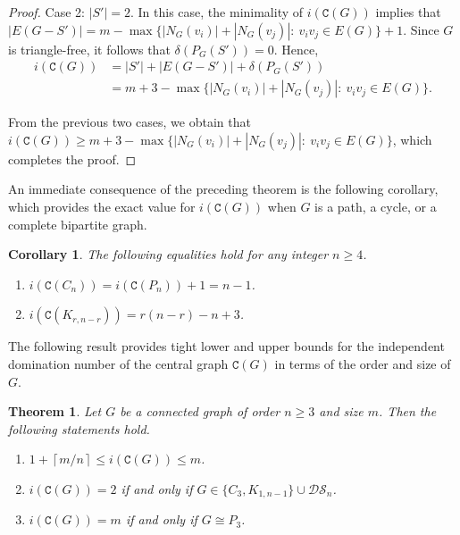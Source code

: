 \documentclass[12pt]{article}
\newtheorem{theorem}[remark]{Theorem}
\newtheorem{corollary}[remark]{Corollary}
\begin{document}
\begin{proof}
\vspace{.2cm}	

\noindent
Case 2: $|S'| =2$. In this case, the minimality of $i(\mathtt{C}(G))$ implies that $|E(G-S')| = m - \max \{|N_G(v_i)| + |N_G(v_j)|:\ v_iv_j \in E(G)\} + 1$. Since $G$ is triangle-free, it follows that  $\delta(P_{G}(S')) = 0$. Hence,
\begin{equation*}
\begin{split}
i(\mathtt{C}(G)) & = |S'| + |E(G-S')| + \delta(P_{G}(S')) \\[4pt]
& = m+3 - \max \{|N_G(v_i)| + |N_G(v_j)|:\ v_iv_j \in E(G)\}.
\end{split}
\end{equation*}

\vspace{.2cm}

\noindent
From the previous two cases, we obtain that $i(\mathtt{C}(G)) \geq m+3 - \max \{|N_G(v_i)| + |N_G(v_j)|:\ v_iv_j \in E(G)\}$, which completes the proof.
\end{proof}

\noindent
An immediate consequence of the preceding theorem is the following corollary, which provides the exact value for $i(\mathtt{C}(G))$ when $G$ is a path, a cycle, or a complete bipartite graph.

\begin{corollary}\label{cor-Cn}
The following equalities hold for any integer $n\geq 4$.
\begin{enumerate}[label={\rm(\roman*)}]
\item \label{cor-2} $i(\mathtt{C}(C_n)) = i(\mathtt{C}(P_n))+1=n-1$.
\item \label{cor-3} $i(\mathtt{C}(K_{r,n-r})) = r(n-r)-n+3$.
\end{enumerate}
\end{corollary}

\noindent
The following result provides tight lower and upper bounds for the independent domination number of the 
central graph $\mathtt{C}(G)$ in terms of the order and size of $G$.

\begin{theorem}
Let $G$ be a connected graph of order $n\geq 3$ and size $m$. Then the following statements hold.
\begin{enumerate}[label={\rm(\roman*)}]
\item \label{theo-1} $1+\left\lceil m/n\right\rceil\leq i(\mathtt{C}(G))\leq m$.
\item \label{theo-2} $i(\mathtt{C}(G))=2$ if and only if $G\in \{C_3,K_{1,n-1}\}\cup \mathcal{DS}_n$.
\item \label{theo-3} $i(\mathtt{C}(G)) =m$ if and only if $G\cong P_3$.
\end{enumerate}
\end{theorem}
\end{document}
